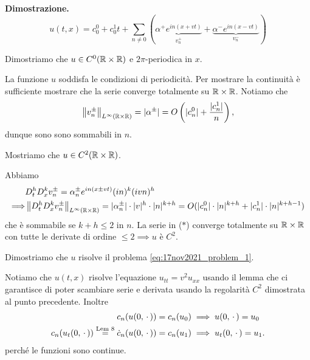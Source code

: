 \textbf{Dimostrazione.}
$$
	u(t,x) = c_0^0 + c_0^1 t + \sum_{n \neq  0} 
	(
	\underbrace{\alpha^+ e^{in(x + vt)}}_{v^+_n} 
	+ 
	\underbrace{\alpha^- e^{in(x - vt)}}_{v^-_n}
	)
$$

Dimostriamo che $u \in C^0(\mathbb R \times \mathbb R)$ e $2\pi$-periodica in $x$. 

La funzione $u$ soddisfa le condizioni di periodicità. Per mostrare la continuità è sufficiente mostrare che la serie converge totalmente su $\mathbb R \times \mathbb R$. Notiamo che
$$
	\left\lVert v^\pm_n \right\rVert_{L^\infty(\mathbb R \times \mathbb R)} = |\alpha^\pm| = O\left( |c_n^0| + \frac{|c_n^1|}{n} \right),
$$
dunque sono sono sommabili in $n$.

Mostriamo che $u \in C^2(\mathbb R \times \mathbb R)$. 

Abbiamo 
%
\begin{align*}
	& D_t^h D_x^k v_n^\pm = \alpha^\pm_n e^{in(x \pm vt)} (in)^k (ivn)^h \\
	\Longrightarrow & \left\lVert D_t^h D_x^k v^\pm_n \right\rVert_{L^\infty(\mathbb R \times \mathbb R)} = |\alpha^\pm_n| \cdot |v|^h \cdot |n|^{k+h}
	= O(|c_n^0| \cdot |n|^{k+h} + |c_n^1| \cdot |n|^{k + h - 1}) 
\end{align*}
%
che è sommabile se $k + h \leq 2$ in $n$. La serie in ($*$) converge totalmente su $\mathbb R \times \mathbb R$ con tutte le derivate di ordine $\leq 2 \implies u$ è $C^2$.

Dimostriamo che $u$ risolve il problema \eqref{eq:17nov2021_problem_1}.


Notiamo che $u(t,x)$ risolve l'equazione $u_{tt} = v^2 u_{xx}$ usando il lemma che ci garantisce di poter scambiare serie e derivata usando la regolarità $C^2$ dimostrata al punto precedente.
Inoltre
\begin{align*}
	c_n(u(0, \,\cdot\,)) = c_n(u_0) & \implies u(0, \,\cdot\,) = u_0 \\
	c_n(u_t(0, \,\cdot\,)) \overset{\text{Lem 8}}{=} \dot c_n (u(0,\,\cdot\,)) = c_n(u_1) & \implies u_t(0, \,\cdot\,) = u_1.
\end{align*}
perché le funzioni sono continue.


